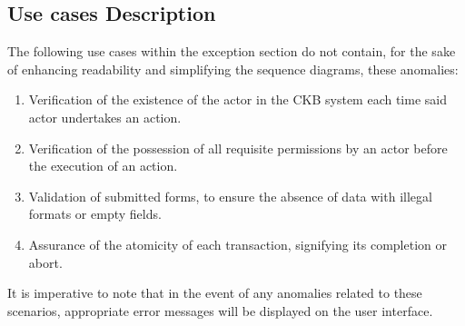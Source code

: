 \subsection{Use cases Description}
The following use cases within the exception section do not contain, for the sake of enhancing readability and simplifying the sequence diagrams, these anomalies: 
\begin{enumerate}
    \item Verification of the existence of the actor in the CKB system each time said actor undertakes an action.
    \item Verification of the possession of all requisite permissions by an actor before the execution of an action.
    \item Validation of submitted forms, to ensure the absence of data with illegal formats or empty fields.
    \item Assurance of the atomicity of each transaction, signifying its completion or abort.
\end{enumerate}
It is imperative to note that in the event of any anomalies related to these scenarios, appropriate error messages will be displayed on the user interface. 


